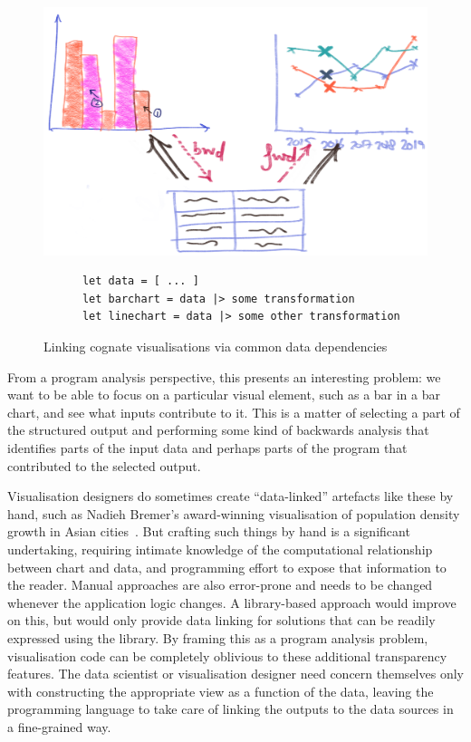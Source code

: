 \begin{figure}[H]
   {\includegraphics[scale=0.14]{fig/example/vis-linking.png}}
   \small
   \begin{lstlisting}
      let data = [ ... ]
      let barchart = data |> some transformation
      let linechart = data |> some other transformation
   \end{lstlisting}
   \caption{Linking cognate visualisations via common data dependencies}
   \label{fig:introduction:vis-linking}
\end{figure}

\noindent From a program analysis perspective, this presents an interesting problem: we want to be able to focus on a particular visual element, such as a bar in a bar chart, and see what inputs contribute to it. This is a matter of selecting a part of the structured output and performing some kind of backwards analysis that identifies parts of the input data and perhaps parts of the program that contributed to the selected output.

Visualisation designers do sometimes create ``data-linked'' artefacts like these by hand, such as Nadieh Bremer's award-winning visualisation of population density growth in Asian cities~\cite{bremer15}. But crafting such things by hand is a significant undertaking, requiring intimate knowledge of the computational relationship between chart and data, and programming effort to expose that information to the reader. Manual approaches are also error-prone and needs to be changed whenever the application logic changes. A library-based approach would improve on this, but would only provide data linking for solutions that can be readily expressed using the library. By framing this as a program analysis problem, visualisation code can be completely oblivious to these additional transparency features. The data scientist or visualisation designer need concern themselves only with constructing the appropriate view as a function of the data, leaving the programming language to take care of linking the outputs to the data sources in a fine-grained way.

